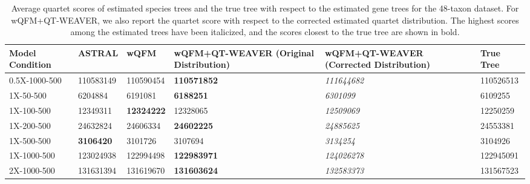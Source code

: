 \documentclass[10pt,a4paper]{article}
\begin{document}
\begin{table}[h!]
    \centering
    \caption{Average quartet scores of estimated species trees and the true tree with respect to the estimated gene trees for the 48-taxon dataset. For wQFM+QT-WEAVER, we also report the quartet score with respect to the corrected estimated quartet distribution. The highest scores among the estimated trees have been italicized, and the scores closest to the true tree are shown in bold.}
    \label{tab:48-quartet-scores-estimated}
    \begin{tabular}{|C{2cm}|C{2.5cm}|C{2.5cm}|C{2.5cm}|C{2.5cm}|C{2.5cm}|}
        \hline
        \textbf{Model Condition} & \textbf{ASTRAL} & \textbf{wQFM} & \textbf{wQFM+QT-WEAVER (Original Distribution)} & \textbf{wQFM+QT-WEAVER (Corrected Distribution)} & \textbf{True Tree} \\
        \hline \hline
        0.5X-1000-500 & 110583149 & 110590454 & \textbf{110571852} & \textit{111644682} & 110526513 \\
        \hline
        1X-50-500 & 6204884 & 6191081 & \textbf{6188251} & \textit{6301099} & 6109255 \\
        \hline
        1X-100-500 & 12349311 & \textbf{12324222} & 12328065 & \textit{12509069} & 12250259 \\
        \hline
        1X-200-500 & 24632824 & 24606334 & \textbf{24602225} & \textit{24885625} & 24553381 \\
        \hline
        1X-500-500 & \textbf{3106420} & 3101726 & 3107694 & \textit{3134254} & 3104926 \\
        \hline
        1X-1000-500 & 123024938 & 122994498 & \textbf{122983971} & \textit{124026278} & 122945091 \\
        \hline
        2X-1000-500 & 131631394 & 131619670 & \textbf{131603624} & \textit{132583373} & 131567523 \\
        \hline
    \end{tabular}
\end{table}
\end{document}
